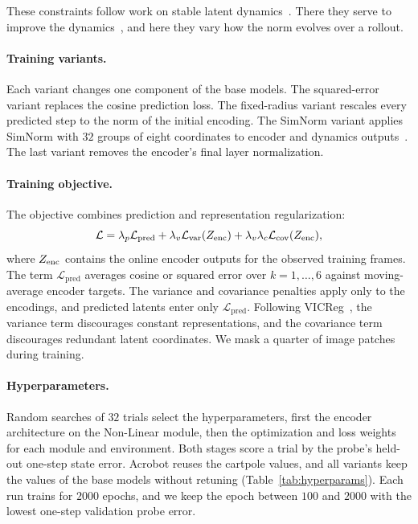 These constraints follow work on stable latent dynamics~\citep{Lusch2018,Morton2018,KolterManek2019}. There they serve to improve the dynamics~\citep{Asadi2018,Bevanda2021,Erichson2019}, and here they vary how the norm evolves over a rollout.

\paragraph{Training variants.} Each variant changes one component of the base models. The squared-error variant replaces the cosine prediction loss. The fixed-radius variant rescales every predicted step to the norm of the initial encoding. The SimNorm variant applies SimNorm with $32$ groups of eight coordinates to encoder and dynamics outputs~\citep{Hansen2023}. The last variant removes the encoder's final layer normalization.

\paragraph{Training objective.} The objective combines prediction and representation regularization:
\begin{equation}
    \mathcal{L} = \lambda_p\mathcal{L}_\text{pred}
    + \lambda_v\mathcal{L}_\text{var}(Z_{\rm enc})
    + \lambda_v\lambda_c\mathcal{L}_\text{cov}(Z_{\rm enc}),
    \label{eq:base_loss}
\end{equation}
where $Z_{\rm enc}$ contains the online encoder outputs for the observed training frames. The term $\mathcal L_{\mathrm{pred}}$ averages cosine or squared error over $k=1,\dots,6$ against moving-average encoder targets. The variance and covariance penalties apply only to the encodings, and predicted latents enter only $\mathcal L_{\mathrm{pred}}$. Following VICReg~\citep{Bardes2022}, the variance term discourages constant representations, and the covariance term discourages redundant latent coordinates. We mask a quarter of image patches during training.

\paragraph{Hyperparameters.} Random searches of $32$ trials select the hyperparameters, first the encoder architecture on the Non-Linear module, then the optimization and loss weights for each module and environment. Both stages score a trial by the probe's held-out one-step state error. Acrobot reuses the cartpole values, and all variants keep the values of the base models without retuning (Table~\ref{tab:hyperparams}). Each run trains for $2000$ epochs, and we keep the epoch between $100$ and $2000$ with the lowest one-step validation probe error.

